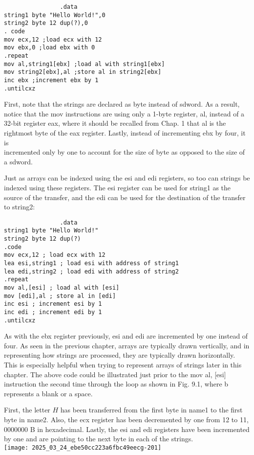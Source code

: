 \documentclass[10pt]{article}
\begin{document}
\begin{verbatim}
                .data
string1 byte "Hello World!",0
string2 byte 12 dup(?),0
. code
mov ecx,12 ;load ecx with 12
mov ebx,0 ;load ebx with 0
.repeat
mov al,string1[ebx] ;load al with string1[ebx]
mov string2[ebx],al ;store al in string2[ebx]
inc ebx ;increment ebx by 1
.untilcxz
\end{verbatim}

First, note that the strings are declared as byte instead of sdword. As a result, notice that the mov instructions are using only a 1-byte register, al, instead of a 32-bit register eax, where it should be recalled from Chap. 1 that al is the rightmost byte of the eax register. Lastly, instead of incrementing ebx by four, it is\\
incremented only by one to account for the size of byte as opposed to the size of a sdword.

Just as arrays can be indexed using the esi and edi registers, so too can strings be indexed using these registers. The esi register can be used for string1 as the source of the transfer, and the edi can be used for the destination of the transfer to string2:

\begin{verbatim}
                .data
string1 byte "Hello World!"
string2 byte 12 dup(?)
.code
mov ecx,12 ; load ecx with 12
lea esi,string1 ; load esi with address of string1
lea edi,string2 ; load edi with address of string2
.repeat
mov al,[esi] ; load al with [esi]
mov [edi],al ; store al in [edi]
inc esi ; increment esi by 1
inc edi ; increment edi by 1
.untilcxz
\end{verbatim}

As with the ebx register previously, esi and edi are incremented by one instead of four. As seen in the previous chapter, arrays are typically drawn vertically, and in representing how strings are processed, they are typically drawn horizontally. This is especially helpful when trying to represent arrays of strings later in this chapter. The above code could be illustrated just prior to the mov al, [esi] instruction the second time through the loop as shown in Fig. 9.1, where b represents a blank or a space.

First, the letter $H$ has been transferred from the first byte in name1 to the first byte in name2. Also, the ecx register has been decremented by one from 12 to 11, 0000000 B in hexadecimal. Lastly, the esi and edi registers have been incremented by one and are pointing to the next byte in each of the strings.\\
\texttt{[image: 2025\_03\_24\_ebe50cc223a6fbc49eecg-201]}
\end{document}
